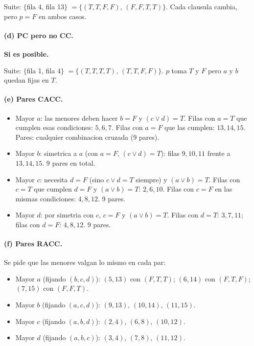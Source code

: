 \documentclass[12pt,a4paper]{article}
\begin{document}
Suite: $\{$fila 4, fila 13$\}$ $=\{(T,T,F,F),\,(F,F,T,T)\}$. Cada clausula cambia, pero $p=F$
en ambos casos.

\paragraph{(d) PC pero no CC.} \textbf{Si es posible.}

Suite: $\{$fila 1, fila 4$\}$ $=\{(T,T,T,T),\,(T,T,F,F)\}$. $p$ toma $T$ y $F$ pero $a$ y $b$
quedan fijas en $T$.

\paragraph{(e) Pares CACC.}

\begin{itemize}
  \item Mayor $a$: las menores deben hacer $b=F$ y $(c\vee d)=T$. Filas con $a=T$ que cumplen
  esas condiciones: $5,6,7$. Filas con $a=F$ que las cumplen: $13,14,15$. Pares: cualquier
  combinacion cruzada (9 pares).
  \item Mayor $b$: simetrica a $a$ (con $a=F$, $(c\vee d)=T$): filas $9,10,11$ frente a $13,14,
  15$. 9 pares en total.
  \item Mayor $c$: necesita $d=F$ (sino $c\vee d=T$ siempre) y $(a\vee b)=T$. Filas con $c=T$ que
  cumplen $d=F$ y $(a\vee b)=T$: $2,6,10$. Filas con $c=F$ en las mismas condiciones: $4,8,12$.
  9 pares.
  \item Mayor $d$: por simetria con $c$, $c=F$ y $(a\vee b)=T$. Filas con $d=T$: $3,7,11$;
  filas con $d=F$: $4,8,12$. 9 pares.
\end{itemize}

\paragraph{(f) Pares RACC.} Se pide que las menores valgan lo mismo en cada par:

\begin{itemize}
  \item Mayor $a$ (fijando $(b,c,d)$): $(5,13)$ con $(F,T,T)$; $(6,14)$ con $(F,T,F)$; $(7,15)$
  con $(F,F,T)$.
  \item Mayor $b$ (fijando $(a,c,d)$): $(9,13)$, $(10,14)$, $(11,15)$.
  \item Mayor $c$ (fijando $(a,b,d)$): $(2,4)$, $(6,8)$, $(10,12)$.
  \item Mayor $d$ (fijando $(a,b,c)$): $(3,4)$, $(7,8)$, $(11,12)$.
\end{itemize}
\end{document}
